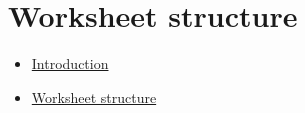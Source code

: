 \hypertarget{worksheet-structure}{%
\section{Worksheet structure}\label{worksheet-structure}}

\begin{itemize}
\tightlist
\item
  \href{excel-structure-intro.html}{Introduction}
\item
  \href{excel-structure.html}{Worksheet structure}
\end{itemize}
